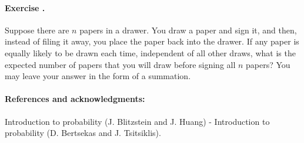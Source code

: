 \documentclass[twocolumn,12pt,a4paper]{article}
\newcounter{num}  %
\begin{document}
\paragraph{Exercise \thenum.}
Suppose there are \( n \) papers in a drawer. You draw a paper and sign it, and then, instead of filing it away, you place the paper back into the drawer. If any paper is equally likely to be drawn each time, independent of all other draws, what is the expected number of papers that you will draw before signing all \( n \) papers? You may leave your answer in the form of a summation.


\paragraph{References and acknowledgments:} Introduction to probability (J. Blitzstein and J. Huang) - Introduction to probability (D. Bertsekas and J.  Tsitsiklis).
\end{document}
